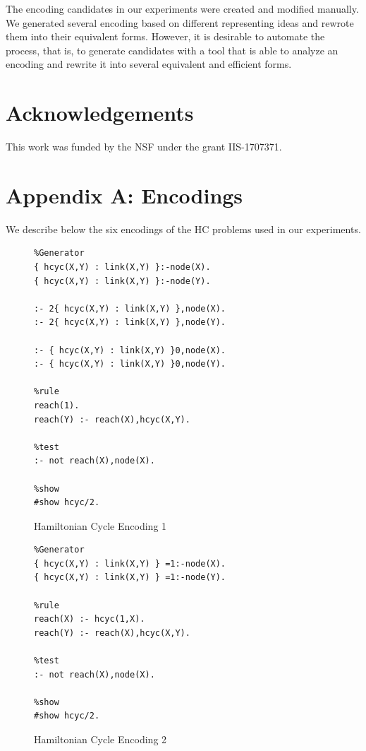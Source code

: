 \documentclass{new_tlp}
\begin{document}
The encoding candidates in our experiments were created and modified manually. 
We generated several encoding based on different representing ideas and rewrote 
them into their equivalent forms. However, it is desirable to automate the 
process, that is, to generate candidates with a tool that is able to analyze 
an encoding and rewrite it into several equivalent and efficient forms. 

\section*{Acknowledgements}
This work was funded by the NSF under the grant IIS-1707371.



\newpage
\section*{Appendix A: Encodings}
We describe below the six encodings of the HC problems used in our 
experiments. %

\begin{figure}[!h]
\figrule
\begin{center}
\begin{verbatim}
%Generator
{ hcyc(X,Y) : link(X,Y) }:-node(X).
{ hcyc(X,Y) : link(X,Y) }:-node(Y).

:- 2{ hcyc(X,Y) : link(X,Y) },node(X).
:- 2{ hcyc(X,Y) : link(X,Y) },node(Y).

:- { hcyc(X,Y) : link(X,Y) }0,node(X).
:- { hcyc(X,Y) : link(X,Y) }0,node(Y).

%rule
reach(1).
reach(Y) :- reach(X),hcyc(X,Y).

%test
:- not reach(X),node(X).

%show
#show hcyc/2.
\end{verbatim}
\end{center}
\caption{Hamiltonian Cycle Encoding 1}\label{enc1}
\figrule
\end{figure}
\begin{figure}[!h]
\figrule
\begin{center}
\begin{verbatim}
%Generator
{ hcyc(X,Y) : link(X,Y) } =1:-node(X).
{ hcyc(X,Y) : link(X,Y) } =1:-node(Y).

%rule
reach(X) :- hcyc(1,X).
reach(Y) :- reach(X),hcyc(X,Y).

%test
:- not reach(X),node(X).

%show
#show hcyc/2.
\end{verbatim}
\end{center}
\caption{Hamiltonian Cycle Encoding 2}\label{enc2}
\figrule
\end{figure}
\end{document}
